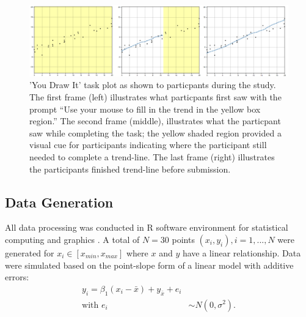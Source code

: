 \documentclass[12pt]{article}
\begin{document}
\begin{figure}[tbp]

{\centering \includegraphics[width=1\linewidth,]{images/ydi-stimuli} 

}

\caption{'You Draw It' task plot as shown to particpants during the study. The first frame (left) illustrates what particpants first saw with the prompt “Use your mouse to fill in the trend in the yellow box region.” The second frame (middle), illustrates what the particpant saw while completing the task; the yellow shaded region provided a visual cue for participants indicating where the participant still needed to complete a trend-line. The last frame (right) illustrates the participants finished trend-line before submission.}\label{fig:ydi-stimuli}
\end{figure}

\hypertarget{data-generation}{%
\subsection{Data Generation}\label{data-generation}}

All data processing was conducted in R software environment for
statistical computing and graphics \citep{Rsoftware}. A total of
\(N = 30\) points \((x_i, y_i), i = 1,...,N\) were generated for
\(x_i \in [x_{min}, x_{max}]\) where \(x\) and \(y\) have a linear
relationship. Data were simulated based on the point-slope form of a
linear model with additive errors: \begin{align}
y_i = \beta_1(x_i-\bar{x}) + y_{\bar{x}} + e_i \\
\text{with } e_i & \sim N(0, \sigma^2). \nonumber
\end{align}
\end{document}
